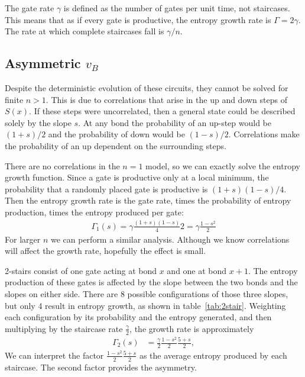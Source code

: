 \documentclass[aps,prx,reprint,superscriptaddress, longbibliography]{revtex4-1}
\begin{document}
The gate rate $\gamma$ is defined as the number of gates per unit time, not staircases.
This means that as if every gate is productive, the entropy growth rate is $\Gamma=2\gamma$.
The rate at which complete staircases fall is $\gamma/n$.

\subsection{Asymmetric $v_B$}

Despite the deterministic evolution of these circuits, they cannot be solved for finite $n>1$. This is due to correlations that arise in the up and down steps of $S(x)$. If these steps were uncorrelated, then a general state could be described solely by the slope $s$. At any bond the probability of an up-step would be $(1+s)/2$ and the probability of down would be $(1-s)/2$. Correlations make the probability of an up dependent on the surrounding steps. 

There are no correlations in the $n=1$ model, so we can exactly solve the entropy growth function.
Since a gate is productive only at a local minimum, the probability that a randomly placed gate is productive is $(1+s)(1-s)/4$. Then the entropy growth rate is the gate rate, times the probability of entropy production, times the entropy produced per gate:
\begin{align}
\Gamma_1(s)=\gamma\frac{(1+s)(1-s)}{4}2 = \gamma\frac{1-s^2}{2}
\end{align}
For larger $n$ we can perform a similar analysis. Although we know correlations will affect the growth rate, hopefully the effect is small. 


2-stairs consist of one gate acting at bond $x$ and one at bond $x+1$. The entropy production of these gates is affected by the slope between the two bonds and the slopes on either side. There are 8 possible configurations of those three slopes, but only 4 result in entropy growth, as shown in table~\ref{tab:2stair}. Weighting each configuration by its probability and the entropy generated, and then multiplying by the staircase rate $\frac{\gamma}{2}$, the growth rate is approximately
\begin{align}
\Gamma_2(s) 
&= \frac{\gamma}{2}\frac{1-s^2}{2}\frac{5+s}{2}, \label{eqn:2rate}
\end{align}
We can interpret the factor $\frac{1-s^2}{2}\frac{5+s}{2}$ as the average entropy produced by each staircase. The second factor provides the asymmetry.
\end{document}
